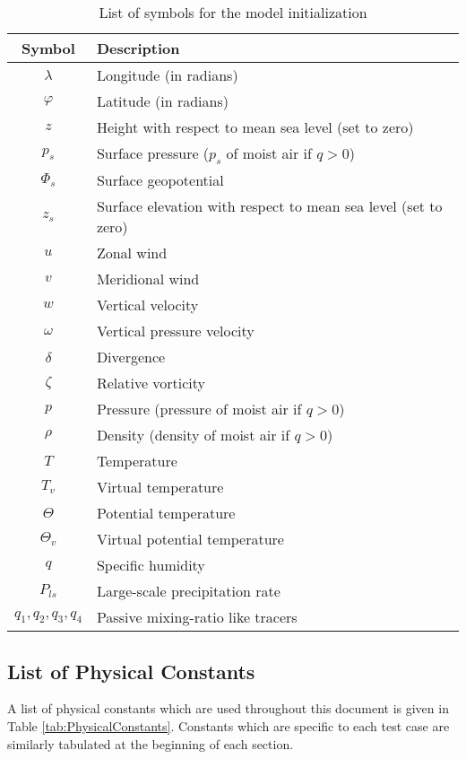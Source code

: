 \documentclass[times,doublespace]{fldauth}
\begin{document}
\begin{table}[h]
\caption{List of symbols for the model initialization} \label{tab:symbols}
\begin{center}
\begin{tabular}{cl}
\hline Symbol & Description \\ \hline 
$\lambda$ & Longitude (in radians) \\
$\varphi$ & Latitude (in radians) \\
$z$ & Height with respect to mean sea level (set to zero) \\
$p_s$ & Surface pressure ($p_s$ of moist air if $q>0$) \\
$\Phi_s$ & Surface geopotential \\
$z_s$ & Surface elevation with respect to mean sea level (set to zero) \\
$u$ & Zonal wind \\
$v$ & Meridional wind \\
$w$ & Vertical velocity \\
$\omega$ & Vertical pressure velocity  \\
$\delta$ & Divergence\\
$\zeta$ & Relative vorticity\\
$p$ & Pressure (pressure of moist air if $q>0$) \\
$\rho$ & Density (density of moist air if $q>0$)\\
$T$ &Temperature \\
$T_v$ & Virtual temperature \\
$\Theta$ & Potential temperature \\
$\Theta_v$ & Virtual potential temperature \\
$q$ & Specific humidity \\
$P_{ls}$ & Large-scale precipitation rate \\
$q_1, q_2, q_3, q_4$ & Passive mixing-ratio like tracers \\
\hline 
\end{tabular}
\end{center}
\end{table}

\subsection{List of Physical Constants}
A list of physical constants which are used throughout this document is given in Table \ref{tab:PhysicalConstants}.  Constants which are specific to each test case are similarly tabulated at the beginning of each section.
\end{document}
